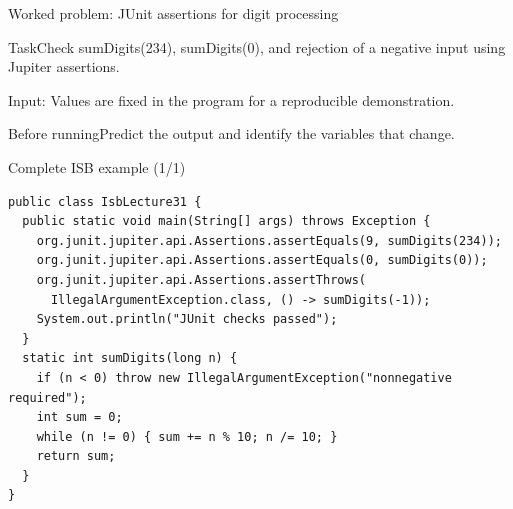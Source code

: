 \documentclass[10pt,aspectratio=169]{beamer}
\begin{document}
\begin{frame}[fragile,t]{Worked problem: JUnit assertions for digit processing}
\begin{block}{Task}Check sumDigits(234), sumDigits(0), and rejection of a negative input using Jupiter assertions.\end{block}
\small Input: Values are fixed in the program for a reproducible demonstration.\par\vspace{3mm}\begin{exampleblock}{Before running}Predict the output and identify the variables that change.\end{exampleblock}
\end{frame}

\begin{frame}[fragile,t]{Complete ISB example (1/1)}
\begin{lstlisting}
public class IsbLecture31 {
  public static void main(String[] args) throws Exception {
    org.junit.jupiter.api.Assertions.assertEquals(9, sumDigits(234));
    org.junit.jupiter.api.Assertions.assertEquals(0, sumDigits(0));
    org.junit.jupiter.api.Assertions.assertThrows(
      IllegalArgumentException.class, () -> sumDigits(-1));
    System.out.println("JUnit checks passed");
  }
  static int sumDigits(long n) {
    if (n < 0) throw new IllegalArgumentException("nonnegative required");
    int sum = 0;
    while (n != 0) { sum += n % 10; n /= 10; }
    return sum;
  }
}
\end{lstlisting}
\end{frame}
\end{document}
